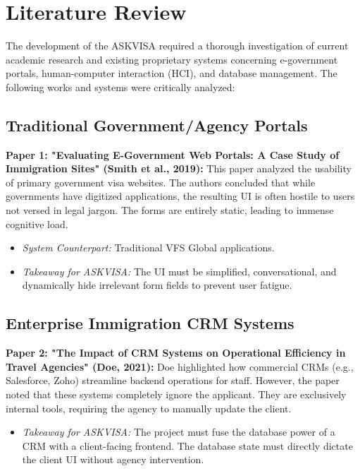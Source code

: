 \documentclass[12pt, a4paper]{article}
\begin{document}
\newpage

\section{Literature Review}
The development of the ASKVISA required a thorough investigation of current academic research and existing proprietary systems concerning e-government portals, human-computer interaction (HCI), and database management. The following works and systems were critically analyzed:

\subsection{Traditional Government/Agency Portals}
\textbf{Paper 1: "Evaluating E-Government Web Portals: A Case Study of Immigration Sites" (Smith et al., 2019):} This paper analyzed the usability of primary government visa websites. The authors concluded that while governments have digitized applications, the resulting UI is often hostile to users not versed in legal jargon. The forms are entirely static, leading to immense cognitive load. 
\begin{itemize}
    \item \textit{System Counterpart:} Traditional VFS Global applications.
    \item \textit{Takeaway for ASKVISA:} The UI must be simplified, conversational, and dynamically hide irrelevant form fields to prevent user fatigue.
\end{itemize}

\subsection{Enterprise Immigration CRM Systems}
\textbf{Paper 2: "The Impact of CRM Systems on Operational Efficiency in Travel Agencies" (Doe, 2021):} Doe highlighted how commercial CRMs (e.g., Salesforce, Zoho) streamline backend operations for staff. However, the paper noted that these systems completely ignore the applicant. They are exclusively internal tools, requiring the agency to manually update the client.
\begin{itemize}
    \item \textit{Takeaway for ASKVISA:} The project must fuse the database power of a CRM with a client-facing frontend. The database state must directly dictate the client UI without agency intervention.
\end{itemize}
\end{document}
